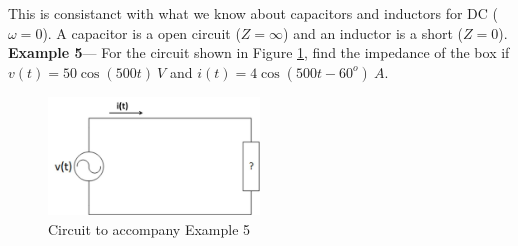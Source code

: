 \documentclass{handout}
\begin{document}
This is consistanct with what we know about capacitors and inductors for DC ($\omega =0$).  A capacitor is a open circuit ($Z=\infty$) and an inductor is a short ($Z=0$).  
\newpage
\clearpage
\pagebreak
\textbf{Example 5}--- For the circuit shown in Figure \ref{fig: Example5}, find the impedance of the box if $v(t) = 50\cos(500t)\  V$ and $i(t)= 4\cos(500t-60^o)\ A$.

\begin{figure} [h!]
\centering
\includegraphics[width=0.5\textwidth]{Example5.jpg}
\caption{Circuit to accompany Example 5}
\label{fig: Example5}
\end{figure}




\newpage
\clearpage
\pagebreak

\newpage
\clearpage
\pagebreak

\newpage
\clearpage
\pagebreak
\end{document}
